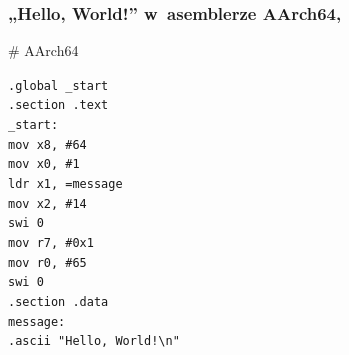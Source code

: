 \documentclass[10pt,t]{beamer}
\begin{document}
\begin{frame}
  \frametitle{„Hello, World!” w~asemblerze AArch64,
    \parencite{Low-Level-Learning-You-Can-Learn-AArch64-ETC-Ver-2020}}


  \# AArch64

  \texttt{.global \_start} \\
  \texttt{.section .text} \\



  \texttt{\_start:} \\[-0.2em]
  \hphantom{aaaaaaaa} \texttt{mov x8, \#64} \\
  \hphantom{aaaaaaaa} \texttt{mov x0, \#1} \\
  \hphantom{aaaaaaaa} \texttt{ldr x1, =message} \\
  \hphantom{aaaaaaaa} \texttt{mov x2, \#14} \\

  \hphantom{aaaaaaaa} \texttt{swi 0} \\

  \hphantom{aaaaaaaa} \texttt{mov r7, \#0x1} \\
  \hphantom{aaaaaaaa} \texttt{mov r0, \#65} \\

  \hphantom{aaaaaaaa} \texttt{swi 0} \\



  \texttt{.section .data} \\
  \texttt{message:} \\
  \hphantom{aaaaaaaa} \texttt{.ascii "Hello, World!\textbackslash n"}

\end{frame}
\end{document}
